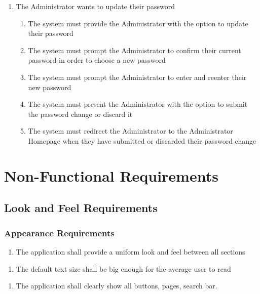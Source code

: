 \documentclass[]{article}
\begin{document}
\begin{enumerate}[{VP}1.]
\begin{enumerate}[{BE3}.1]
	    \item The Administrator wants to update their password
	    \begin{enumerate}
	         \item The system must provide the Administrator with the option to update their password
		    \item The system must prompt the Administrator to confirm their current password in order to choose a new password
		    \item The system must prompt the Administrator to enter and reenter their new password
		    \item The system must present the Administrator with the option to submit the password change or discard it
		    \item The system must redirect the Administrator to the Administrator Homepage when they have submitted or discarded their password change
	    \end{enumerate}
	\end{enumerate}
\end{enumerate}


\section{Non-Functional Requirements}
\label{sec:non-functional_requirements}
\subsection{Look and Feel Requirements}
\label{sub:look_and_feel_requirements}

\subsubsection{Appearance Requirements}
\label{ssub:appearance_requirements}
\begin{enumerate}[{LF}1. ]
	\item The application {\color{red}shall} provide a uniform look and feel between all sections
\end{enumerate}
\begin{enumerate}[{LF}2. ]
	\item The default text size shall be big enough for the average user to read
\end{enumerate}
\begin{enumerate}[{LF}3. ]
	\item The application {\color{red}shall} clearly show all buttons, pages, search bar.
\end{enumerate}
\end{document}

